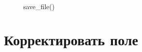 \documentclass[12pt, a4paper]{article}
\begin{document}
\begin{figure}[H]
    \caption{save\_file()}
\end{figure}


\newpage
\section{Корректировать поле}

\end{document}

